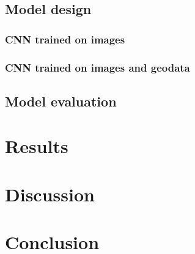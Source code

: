 \documentclass[12pt,a4paper,oneside]{article}
\begin{document}

\subsection{Model design}

\subsubsection{CNN trained on images}

\subsubsection{CNN trained on images and geodata}

\subsection{Model evaluation}



\section{Results}

\section{Discussion}

\section{Conclusion}

\printbibliography
\end{document}
